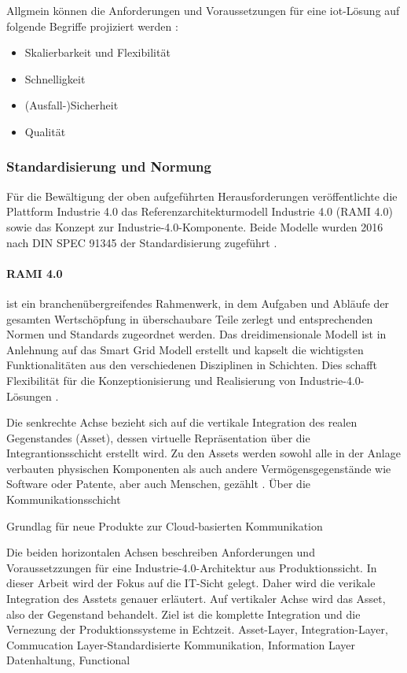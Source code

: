 Allgmein können die Anforderungen und Voraussetzungen für eine \ac{iot}-Lösung auf folgende Begriffe projiziert werden \citep{Acharya2019}:

\begin{itemize}
  \item Skalierbarkeit und Flexibilität
  \item Schnelligkeit
  \item (Ausfall-)Sicherheit
  \item Qualität
\end{itemize}

\subsubsection{Standardisierung und Normung}

Für die Bewältigung der oben aufgeführten Herausforderungen veröffentlichte die Plattform Industrie 4.0 das \glqq Referenzarchitekturmodell Industrie 4.0\grqq{} (RAMI 4.0) sowie das Konzept zur \glqq Industrie-4.0-Komponente\grqq{}. Beide Modelle wurden 2016 nach DIN SPEC 91345 der Standardisierung zugeführt \citep{Beuth2016}.

\paragraph{RAMI 4.0} ist ein branchenübergreifendes Rahmenwerk, in dem Aufgaben und Abläufe der gesamten Wertschöpfung in überschaubare Teile zerlegt und entsprechenden Normen und Standards zugeordnet werden. Das dreidimensionale Modell ist in Anlehnung auf das Smart Grid Modell erstellt und kapselt die wichtigsten Funktionalitäten aus den verschiedenen Disziplinen in Schichten. Dies schafft Flexibilität für die Konzeptionisierung und Realisierung von Industrie-4.0-Lösungen \citep{Huebner2017}.

Die senkrechte Achse bezieht sich auf die vertikale Integration des realen Gegenstandes (Asset), dessen virtuelle Repräsentation über die Integrantionsschicht erstellt wird. Zu den Assets werden sowohl alle in der Anlage verbauten physischen Komponenten als auch andere Vermögensgegenstände wie Software oder Patente, aber auch Menschen, gezählt \citep{Adolphs2017}.
 Über die Kommunikationsschicht


Grundlag für neue Produkte zur Cloud-basierten Kommunikation


Die beiden horizontalen Achsen beschreiben Anforderungen und Voraussetzzungen für eine Industrie-4.0-Architektur aus Produktionssicht. In dieser Arbeit wird der Fokus auf die IT-Sicht gelegt. Daher wird die verikale Integration des Asstets genauer erläutert.
Auf vertikaler Achse wird das Asset, also der Gegenstand behandelt. Ziel ist die komplette Integration und die Vernezung der Produktionssysteme in Echtzeit. Asset-Layer, Integration-Layer, Commucation Layer-Standardisierte Kommunikation, Information Layer Datenhaltung, Functional



